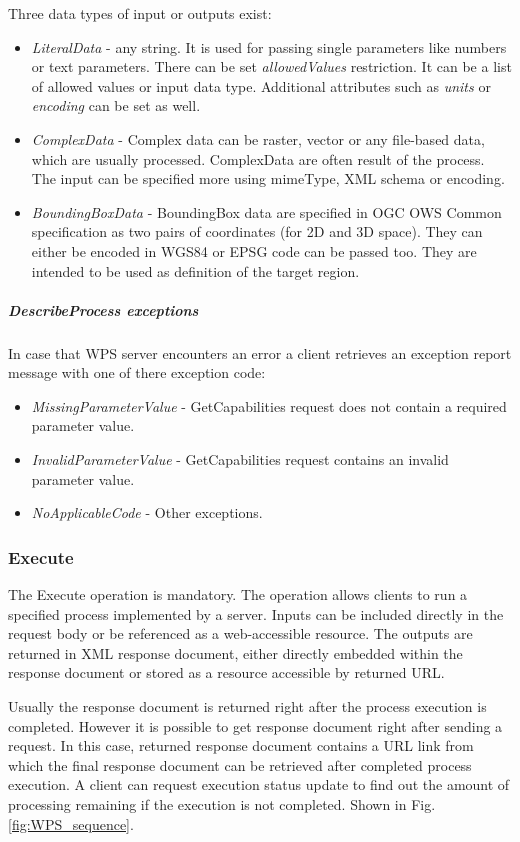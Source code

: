 \newpage
\noindent
Three data types of input or outputs exist:
\begin{itemize}
\item\textit{LiteralData} - any string. It is used for passing single parameters like numbers or text parameters. There can be set
\textit{allowedValues} restriction. It can be a list of allowed values or input data type. Additional attributes such as \textit{units}
or \textit{encoding} can be set as well. 
\item\textit{ComplexData} - Complex data can be raster, vector or any file-based data, which are usually processed. ComplexData 
are often result of the process. The input can be specified more using mimeType, XML schema or encoding.
\item\textit{BoundingBoxData} - BoundingBox data are specified in OGC OWS Common specification as two pairs of coordinates (for 2D and 3D space). They can either be encoded in WGS84 or EPSG code can be passed too. They are intended to be used as definition of the target region.
\end{itemize}

\subparagraph{DescribeProcess exceptions}
In case that WPS server encounters an error a client retrieves an exception report message with one of there exception code:
\begin{itemize}
\item\textit{MissingParameterValue} - GetCapabilities request does not contain a required parameter value.
\item\textit{InvalidParameterValue} - GetCapabilities request contains an invalid parameter value.
\item\textit{NoApplicableCode} - Other exceptions.
\end{itemize}

\subsubsection{Execute}
The Execute operation is mandatory. The operation allows clients to run a specified process implemented by a server.
Inputs can be included directly in the request body or be referenced as a web-accessible resource. The outputs are returned
in XML response document, either directly embedded within the response document or stored as a resource accessible by
returned URL.

Usually the response document is returned right after the process execution is completed. However it is possible to get
response document right after sending a request. In this case, returned response document contains a URL link from which the
final response document can be retrieved after completed process execution. A client can request execution status update to
find out the amount of processing remaining if the execution is not completed. Shown in Fig. \ref{fig:WPS_sequence}.

